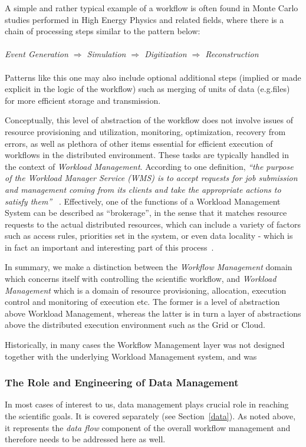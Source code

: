 A simple and rather typical example of a workflow is often found in Monte Carlo studies performed in High Energy Physics and related fields, where there is a chain of processing steps similar to the pattern below:
\\
\\
\textit{Event  Generation $\Longrightarrow$ Simulation $\Longrightarrow$ Digitization $\Longrightarrow$ Reconstruction}
\\
\\
Patterns like this one may also include optional additional steps (implied or made explicit in the logic of the workflow) such as merging of units of data (e.g.files) for more efficient storage and transmission.

Conceptually, this level of abstraction of the workflow does not  involve issues of resource provisioning and utilization, monitoring, optimization, recovery from errors, as well as plethora of other items essential
for efficient execution of workflows in the distributed environment. These tasks are typically handled in the context of \textit{Workload Management}. According to one definition, \textit{``the purpose of the Workload Manager Service (WMS) is to accept requests for job submission and
management coming from its clients and take the appropriate actions to satisfy them''} ~\cite{egee_user_guide}. Effectively, one of the functions of a Workload Management System can be described as ``brokerage'', in the sense that it matches resource requests to the actual distributed resources, which can include a variety of factors such as access rules, priorities set in the system, or even data locality - which is in fact an important and interesting part of this process~\cite{panda_chep11}.

In summary, we make a distinction between the \textit{Workflow Management} domain which concerns itself with controlling the scientific workflow, and \textit{Workload Management} which is a domain of resource provisioning, allocation, execution control and monitoring of execution etc. The former is a level of abstraction above Workload Management, whereas the latter is in turn a layer of abstractions above the distributed execution environment such as the Grid or Cloud.

Historically, in many cases the Workflow Management layer was not designed together with the underlying Workload Management system, and was 

\subsubsection{The Role and Engineering of Data Management}
In most cases of interest to us, data management plays crucial role in reaching the scientific goals. It is covered separately (see Section~\ref{data}). As noted above, it represents the \textit{data flow} component of the overall workflow management and therefore needs to be addressed here as well.

